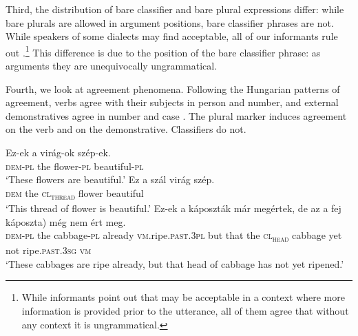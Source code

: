 \documentclass[output=paper]{langscibook}
\begin{document}
\noindent Third, the distribution of bare classifier and bare plural expressions differ: while bare plurals are allowed in argument positions, bare classifier phrases are not. While speakers of some dialects may find  acceptable, all of our informants rule out .\footnote{While informants point out that  may be acceptable in a context where more information is provided prior to the utterance, all of them agree that without any context it is ungrammatical.} This difference is due to the position of the bare classifier phrase: as arguments they are unequivocally ungrammatical.  

\ea \label{schv-nem:ex:26}
\label{schv-nem:ex:26a}
 \label{schv-nem:ex:26b}
\z
\ex \label{schv-nem:ex:27}
  \label{schv-nem:ex:27b}
\z
\z

\noindent Fourth, we look at agreement phenomena. Following the Hungarian patterns of agreement, verbs agree with their subjects in person and number, and external demonstratives agree in number and case \citep{kenesei-etal-98}. The plural marker induces agreement on the verb and on the demonstrative. Classifiers do not. 

\ea \label{schv-nem:ex:28}
\ea \label{schv-nem:ex:28a}
\gll Ez-ek a virág-ok szép-ek. \\  
\textsc{dem}-\textsc{pl} the flower-\textsc{pl} beautiful-\textsc{pl}\\ 
\glt `These flowers are beautiful.'
\ex \label{schv-nem:ex:28b}
\gll Ez a szál virág szép. \\
\textsc{dem} the \textsc{cl\textsubscript{thread}} flower beautiful \\
\glt `This thread of flower is beautiful.'
\z
\ex \label{schv-nem:ex:29}
\gll Ez-ek a káposzták már megértek, de az a fej\hspace{1.5cm} \minsp{(} káposzta) még nem ért meg. \\
\textsc{dem}-\textsc{pl} the cabbage-\textsc{pl} already \textsc{vm}.ripe.\textsc{past}.\textsc{3pl} but that  the \textsc{cl\textsubscript{head}} {} cabbage yet not ripe.\textsc{past}.\textsc{3sg} \textsc{vm}\\
\glt `These cabbages are ripe already, but that head of cabbage has not yet ripened.'
\z
\end{document}
